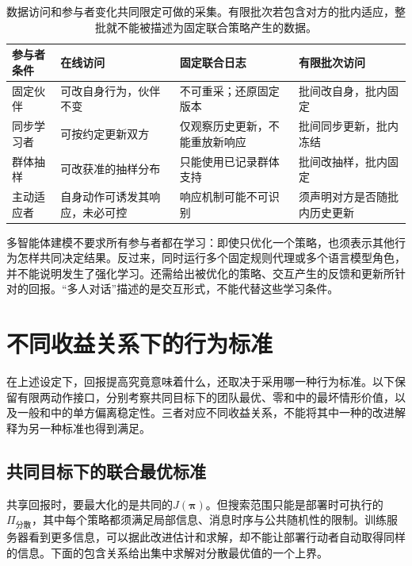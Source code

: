 \begin{table}[htbp]
 \centering
 \begin{tabularx}{\linewidth}{@{}l >{\raggedright\arraybackslash}X >{\raggedright\arraybackslash}X >{\raggedright\arraybackslash}X@{}}
 \toprule
 参与者条件 & 在线访问 & 固定联合日志 & 有限批次访问\\
 \midrule
 固定伙伴 & 可改自身行为，伙伴不变 & 不可重采；还原固定版本 & 批间改自身，批内固定\\
 同步学习者 & 可按约定更新双方 & 仅观察历史更新，不能重放新响应 & 批间同步更新，批内冻结\\
 群体抽样 & 可改获准的抽样分布 & 只能使用已记录群体支持 & 批间改抽样，批内固定\\
 主动适应者 & 自身动作可诱发其响应，未必可控 & 响应机制可能不可识别 & 须声明对方是否随批内历史更新\\
 \bottomrule
 \end{tabularx}
 \caption{数据访问和参与者变化共同限定可做的采集。有限批次若包含对方的批内适应，整批就不能被描述为固定联合策略产生的数据。}
 \label{tab:rl-multi-agent-access}
\end{table}

多智能体建模不要求所有参与者都在学习：即使只优化一个策略，也须表示其他行为怎样共同决定结果。反过来，同时运行多个固定规则代理或多个语言模型角色，并不能说明发生了强化学习。还需给出被优化的策略、交互产生的反馈和更新所针对的回报。“多人对话”描述的是交互形式，不能代替这些学习条件。

\section{不同收益关系下的行为标准}
\label{sec:rl-multi-agent-solutions}

在上述设定下，回报提高究竟意味着什么，还取决于采用哪一种行为标准。以下保留有限两动作接口，分别考察共同目标下的团队最优、零和中的最坏情形价值，以及一般和中的单方偏离稳定性。三者对应不同收益关系，不能将其中一种的改进解释为另一种标准也得到满足。

\subsection{共同目标下的联合最优标准}
\label{sec:rl-multi-agent-team}

共享回报时，要最大化的是共同的$J(\bm\pi)$。但搜索范围只能是部署时可执行的$\Pi_{\text{分散}}$，其中每个策略都须满足局部信息、消息时序与公共随机性的限制。训练服务器看到更多信息，可以据此改进估计和求解，却不能让部署行动者自动取得同样的信息。下面的包含关系给出集中求解对分散最优值的一个上界。

